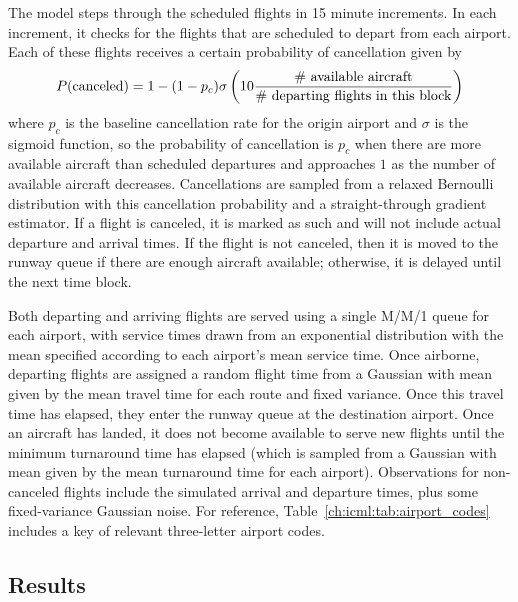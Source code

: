 The model steps through the scheduled flights in 15 minute increments. In each increment, it checks for the flights that are scheduled to depart from each airport. Each of these flights receives a certain probability of cancellation given by
\begin{equation}
    P(\text{canceled}) = 1 - (1 - p_c) \sigma\left( 10 \frac{\text{\# available aircraft}}{\text{\# departing flights in this block}} \right)
\end{equation}
where $p_c$ is the baseline cancellation rate for the origin airport and $\sigma$ is the sigmoid function, so the probability of cancellation is $p_c$ when there are more available aircraft than scheduled departures and approaches $1$ as the number of available aircraft decreases. Cancellations are sampled from a relaxed Bernoulli distribution with this cancellation probability and a straight-through gradient estimator. If a flight is canceled, it is marked as such and will not include actual departure and arrival times. If the flight is not canceled, then it is moved to the runway queue if there are enough aircraft available; otherwise, it is delayed until the next time block.

Both departing and arriving flights are served using a single M/M/1 queue for each airport, with service times drawn from an exponential distribution with the mean specified according to each airport's mean service time. Once airborne, departing flights are assigned a random flight time from a Gaussian with mean given by the mean travel time for each route and fixed variance. Once this travel time has elapsed, they enter the runway queue at the destination airport. Once an aircraft has landed, it does not become available to serve new flights until the minimum turnaround time has elapsed (which is sampled from a Gaussian with mean given by the mean turnaround time for each airport). Observations for non-canceled flights include the simulated arrival and departure times, plus some fixed-variance Gaussian noise. For reference, Table~\ref{ch:icml:tab:airport_codes} includes a key of relevant three-letter airport codes.



\subsection{Results}

